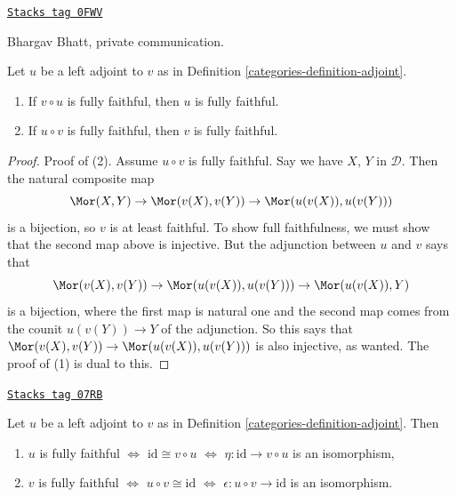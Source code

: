 \begin{lemma}
\label{categories-lemma-left-adjoint-composed-fully-faithful}
\href{https://stacks.math.columbia.edu/tag/0FWV}{\texttt{Stacks tag 0FWV}}

\begin{reference}
Bhargav Bhatt, private communication.
\end{reference}
Let $u$ be a left adjoint to $v$ as in Definition \ref{categories-definition-adjoint}.
\begin{enumerate}
\item If $v \circ u$ is fully faithful, then $u$ is fully faithful.
\item If $u \circ v$ is fully faithful, then $v$ is fully faithful.
\end{enumerate}
\end{lemma}

\begin{proof}
Proof of (2). Assume $u \circ v$ is fully faithful.
Say we have $X$, $Y$ in $\mathcal{D}$.
Then the natural composite map
$$
\Mor(X,Y) \to \Mor(v(X),v(Y)) \to \Mor(u(v(X)), u(v(Y)))
$$
is a bijection, so $v$ is at least faithful. To show full faithfulness,
we must show that the second map above is injective.
But the adjunction between $u$ and $v$ says that
$$
\Mor(v(X), v(Y)) \to \Mor(u(v(X)), u(v(Y))) \to \Mor(u(v(X)), Y)
$$
is a bijection, where the first map is natural one and
the second map comes from the counit $u(v(Y)) \to Y$ of the adjunction.
So this says that
$\Mor(v(X), v(Y)) \to \Mor(u(v(X)), u(v(Y)))$
is also injective, as wanted. The proof of (1) is dual to this.
\end{proof}

\begin{lemma}
\label{categories-lemma-adjoint-fully-faithful}
\href{https://stacks.math.columbia.edu/tag/07RB}{\texttt{Stacks tag 07RB}}

Let $u$ be a left adjoint to $v$ as in Definition \ref{categories-definition-adjoint}.
Then
\begin{enumerate}
\item $u$ is fully faithful $\Leftrightarrow$ $\text{id} \cong v \circ u$
$\Leftrightarrow$ $\eta : \text{id} \to v \circ u$ is an isomorphism,
\item $v$ is fully faithful $\Leftrightarrow$
$u \circ v \cong \text{id}$ $\Leftrightarrow$
$\epsilon : u \circ v \to \text{id}$ is an isomorphism.
\end{enumerate}
\end{lemma}


